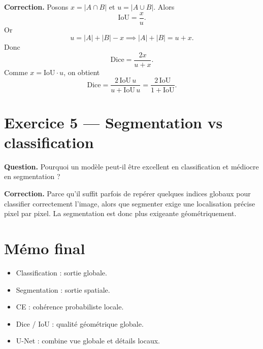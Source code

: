 \documentclass[11pt]{article}
\begin{document}
\textbf{Correction.}
Posons $x=|A\cap B|$ et $u=|A\cup B|$. Alors
\[
\mathrm{IoU}=\frac{x}{u}.
\]
Or
\[
u=|A|+|B|-x \implies |A|+|B|=u+x.
\]
Donc
\[
\mathrm{Dice}=\frac{2x}{u+x}.
\]
Comme $x=\mathrm{IoU}\cdot u$, on obtient
\[
\mathrm{Dice}=\frac{2\,\mathrm{IoU}\,u}{u+\mathrm{IoU}\,u}=\frac{2\,\mathrm{IoU}}{1+\mathrm{IoU}}.
\]

\section{Exercice 5 — Segmentation vs classification}
\textbf{Question.} Pourquoi un modèle peut-il être excellent en classification et médiocre en segmentation ?

\textbf{Correction.}
Parce qu'il suffit parfois de repérer quelques indices globaux pour classifier correctement l'image, alors que segmenter exige une localisation précise pixel par pixel. La segmentation est donc plus exigeante géométriquement.

\section{Mémo final}
\begin{itemize}
  \item Classification : sortie globale.
  \item Segmentation : sortie spatiale.
  \item CE : cohérence probabiliste locale.
  \item Dice / IoU : qualité géométrique globale.
  \item U-Net : combine vue globale et détails locaux.
\end{itemize}
\end{document}
